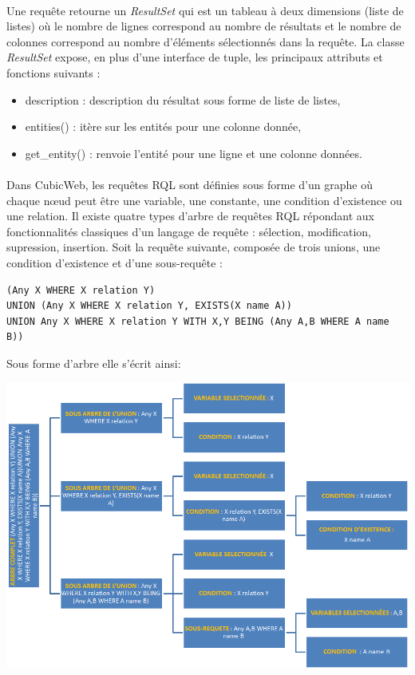 \documentclass {report}
\begin{document}
\paragraph{}
    Une requête retourne un \textit{ResultSet} qui est un tableau à deux dimensions (liste de listes) où le nombre de lignes correspond au nombre de résultats et le nombre de colonnes correspond au nombre d'éléments sélectionnés dans la requête. La classe \textit{ResultSet} expose, en plus d’une interface de tuple, les principaux attributs et fonctions suivants :
\begin{itemize}
\item description : description du résultat sous forme de liste de listes,
\item entities() : itère sur les entités pour une colonne donnée,
\item get\_entity() : renvoie l’entité pour une ligne et une colonne
données.
\end{itemize}

\paragraph{}
Dans CubicWeb, les requêtes RQL sont définies sous forme d'un graphe où chaque nœud peut être une variable, une constante, une condition d'existence ou une relation. Il existe quatre types d'arbre de requêtes RQL répondant aux fonctionnalités classiques d'un langage de requête : sélection, modification, supression, insertion. Soit la requête suivante, composée de trois unions, une condition d'existence et d'une sous-requête : 
\begin{lstlisting}[caption= Requête RQL]
(Any X WHERE X relation Y) 
UNION (Any X WHERE X relation Y, EXISTS(X name A))
UNION Any X WHERE X relation Y WITH X,Y BEING (Any A,B WHERE A name B))
\end{lstlisting}

Sous forme d'arbre elle s'écrit ainsi:
\begin{center}
\includegraphics[scale=0.7]{graph.png}
\end{center}
\end{document}
